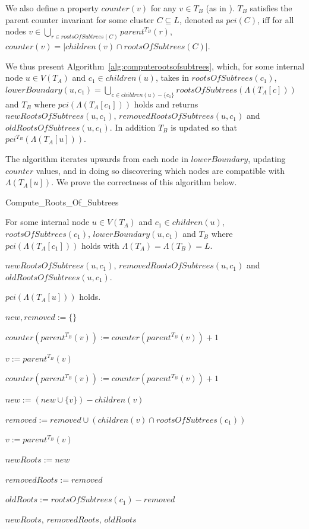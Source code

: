 \documentclass{article}
\newcommand{\leafset}{\Lambda}
\begin{document}
    We also define a property $counter(v)$ for any $v \in T_B$ (as in \cite{jansson2018algorithms}). $T_B$ satisfies the parent counter invariant for some cluster $C \subseteq L$, denoted as $pci(C)$, iff for all nodes $v \in \bigcup_{r \in rootsOfSubtrees(C)} parent^{T_B}(r)$, $counter(v) = |children(v) \cap rootsOfSubtrees(C)|$.

    We thus present Algorithm~\ref{alg:computerootsofsubtrees}, which, for some internal node $u \in V(T_A)$ and $c_1 \in children(u)$, takes in $rootsOfSubtrees(c_1)$, $lowerBoundary(u, c_1) = \bigcup_{c \in children(u) - \{c_1\}} rootsOfSubtrees(\leafset(T_A[c]))$ and $T_B$ where $pci(\leafset(T_A[c_1]))$ holds and returns $newRootsOfSubtrees(u, c_1)$, $removedRootsOfSubtrees(u, c_1)$ and $oldRootsOfSubtrees(u, c_1)$. In addition $T_B$ is updated so that $pci^{T_B}(\leafset(T_A[u]))$.

    The algorithm iterates upwards from each node in $lowerBoundary$, updating $counter$ values, and in doing so discovering which nodes are compatible with $\leafset(T_A[u])$. We prove the correctness of this algorithm below.

    \begin{algorithm}
        \caption{Compute\_Roots\_Of\_Subtrees}
        \label{alg:computerootsofsubtrees}

        \begin{algorithmic}[1]
            \Input For some internal node $u \in V(T_A)$ and $c_1 \in children(u)$, $rootsOfSubtrees(c_1)$, $lowerBoundary(u, c_1)$ and $T_B$ where $pci(\leafset(T_A[c_1]))$ holds with $\leafset(T_A) = \leafset(T_B) = L$.

            \Output $newRootsOfSubtrees(u, c_1)$, $removedRootsOfSubtrees(u, c_1)$ and $oldRootsOfSubtrees(u, c_1)$.

            \SideEffect $pci(\leafset(T_A[u]))$ holds.

            \State $new, removed := \{\}$

                \State $counter(parent^{T_B}(v)) := counter(parent^{T_B}(v)) + 1$

                \State $v := parent^{T_B}(v)$

                    \State $counter(parent^{T_B}(v)) := counter(parent^{T_B}(v)) + 1$

                    \State $new := (new \cup \{v\}) - children(v)$

                    \State $removed := removed \cup (children(v) \cap rootsOfSubtrees(c_1))$

                    \State $v := parent^{T_B}(v)$
                \EndWhile
            \EndFor

            \State $newRoots := new$

            \State $removedRoots := removed$

            \State $oldRoots := rootsOfSubtrees(c_1) - removed$

            \State \Return $newRoots$, $removedRoots$, $oldRoots$
        \end{algorithmic}
    \end{algorithm}
\end{document}
